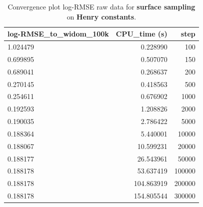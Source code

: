 \documentclass[main]{subfiles}
\begin{document}
\begin{table}[ht]
  \begin{tabular}{|l|r|r|}
  \hline
   log-RMSE\_to\_widom\_100k &  CPU\_time (s) &   step \\
  \hline
             1.024479 &      0.228990 &    100 \\
             0.699895 &      0.507070 &    150 \\
             0.689041 &      0.268637 &    200 \\
             0.270145 &      0.418563 &    500 \\
             0.254611 &      0.676902 &   1000 \\
             0.192593 &      1.208826 &   2000 \\
             0.190035 &      2.786422 &   5000 \\
             0.188364 &      5.440001 &  10000 \\
             0.188067 &     10.599231 &  20000 \\
             0.188177 &     26.543961 &  50000 \\
             0.188178 &     53.637419 & 100000 \\
             0.188178 &    104.863919 & 200000 \\
             0.188178 &    154.805544 & 300000 \\
  \hline
  \end{tabular}
  \caption{Convergence plot log-RMSE raw data for \textbf{surface sampling} on \textbf{Henry constants}. }\label{tab:conv_henry}
\end{table}

\end{document}

